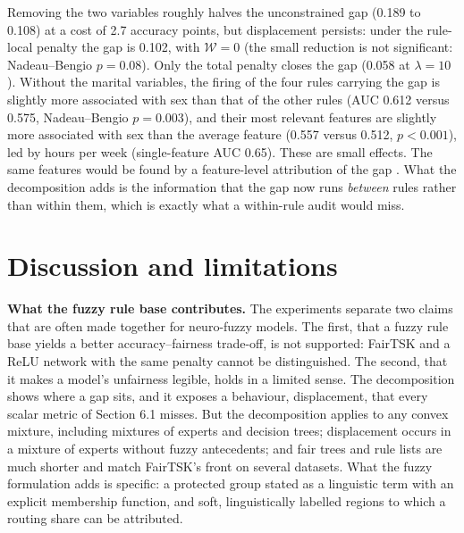 \documentclass[pdflatex,sn-basic,Numbered,lineno]{sn-jnl}
\begin{document}
Removing the two variables roughly halves the unconstrained gap (0.189 to 0.108) at a cost of 2.7 accuracy points, but displacement persists: under the rule-local penalty the gap is 0.102, with \(\mathcal W = 0\) (the small reduction is not significant: Nadeau--Bengio \(p = 0.08\)). Only the total penalty closes the gap (0.058 at \(\lambda = 10\)). Without the marital variables, the firing of the four rules carrying the gap is slightly more associated with sex than that of the other rules (AUC 0.612 versus 0.575, Nadeau--Bengio \(p = 0.003\)), and their most relevant features are slightly more associated with sex than the average feature (0.557 versus 0.512, \(p < 0.001\)), led by hours per week (single-feature AUC 0.65). These are small effects. The same features would be found by a feature-level attribution of the gap \cite{begley}. What the decomposition adds is the information that the gap now runs \emph{between} rules rather than within them, which is exactly what a within-rule audit would miss.

\hypertarget{discussion-and-limitations}{%
\section{Discussion and limitations}\label{discussion-and-limitations}}

\textbf{What the fuzzy rule base contributes.} The experiments separate two claims that are often made together for neuro-fuzzy models. The first, that a fuzzy rule base yields a better accuracy--fairness trade-off, is not supported: FairTSK and a ReLU network with the same penalty cannot be distinguished. The second, that it makes a model's unfairness legible, holds in a limited sense. The decomposition shows where a gap sits, and it exposes a behaviour, displacement, that every scalar metric of Section 6.1 misses. But the decomposition applies to any convex mixture, including mixtures of experts and decision trees; displacement occurs in a mixture of experts without fuzzy antecedents; and fair trees and rule lists are much shorter and match FairTSK's front on several datasets. What the fuzzy formulation adds is specific: a protected group stated as a linguistic term with an explicit membership function, and soft, linguistically labelled regions to which a routing share can be attributed.
\end{document}
